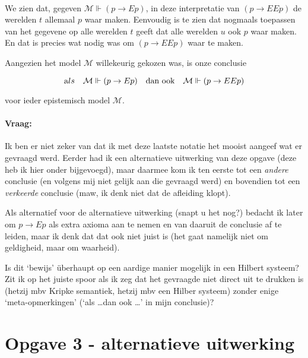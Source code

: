 \documentclass[a4paper,11pt]{article}
\begin{document}
\paragraph{}

We zien dat, gegeven $\mathcal{M} \Vdash (p \to E p)$, in deze interpretatie
van $(p \to E E p)$ de werelden $t$ allemaal $p$ waar maken. Eenvoudig is te
zien dat nogmaals toepassen van het gegevene op alle werelden $t$ geeft dat
alle werelden $u$ ook $p$ waar maken. En dat is precies wat nodig was om $(p
\to E E p)$ waar te maken.

Aangezien het model $\mathcal{M}$ willekeurig gekozen was, is onze conclusie

\begin{displaymath}
\mbox als \quad \mathcal{M} \Vdash (p \to E p) \quad \mbox{dan ook} \quad \mathcal{M} \Vdash(p \to E E p)
\end{displaymath}

voor ieder epistemisch model $\mathcal{M}$.

\paragraph{Vraag:}

Ik ben er niet zeker van dat ik met deze laatste notatie het mooist aangeef
wat er gevraagd werd. Eerder had ik een alternatieve uitwerking van deze
opgave (deze heb ik hier onder bijgevoegd), maar daarmee kom ik ten eerste tot
een \emph{andere} conclusie (en volgens mij niet gelijk aan die gevraagd werd)
en bovendien tot een \emph{verkeerde} conclusie (maw, ik denk niet dat de
afleiding klopt).

Als alternatief voor de alternatieve uitwerking (snapt u het nog?) bedacht ik
later om $p \to E p$ als extra axioma aan te nemen en van daaruit de conclusie
af te leiden, maar ik denk dat dat ook niet juist is (het gaat namelijk niet
om geldigheid, maar om waarheid).

Is dit `bewijs' \"uberhaupt op een aardige manier mogelijk in een Hilbert
systeem? Zit ik op het juiste spoor als ik zeg dat het gevraagde niet direct
uit te drukken is (hetzij mbv Kripke semantiek, hetzij mbv een Hilber systeem)
zonder enige `meta-opmerkingen' (`als \ldots dan ook \ldots' in mijn
conclusie)?


\section*{Opgave 3 - alternatieve uitwerking}
\end{document}
